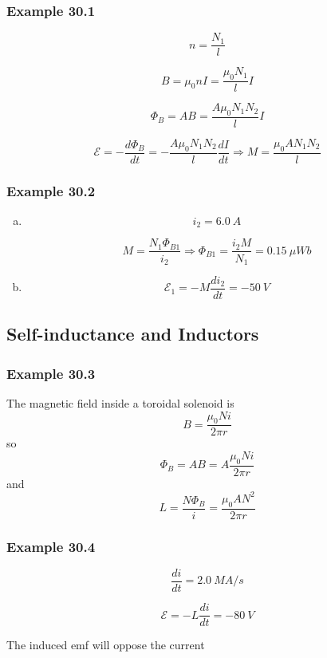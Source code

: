 \documentclass{article}
\begin{document}
\subsubsection{Example 30.1}

\[n = \frac{N_1}{l}\]

\[B = \mu_0 n I = \frac{\mu_0 N_1}{l} I\]

\[\Phi_B = A B = \frac{A \mu_0 N_1 N_2}{l} I\]

\[\mathcal{E} = -\frac{d \Phi_B}{dt} = -\frac{A \mu_0 N_1 N_2}{l} \frac{dI}{dt} \Rightarrow M = \frac{\mu_0 A N_1 N_2}{l}\]

\subsubsection{Example 30.2}

\begin{enumerate}[(a)]
  \item

        \[i_2 = \qty{6.0}{A}\]

        \[M = \frac{N_1 \Phi_{B1}}{i_2} \Rightarrow \Phi_{B1} = \frac{i_2 M}{N_1} = \qty{0.15}{\mu Wb}\]

  \item \[\mathcal{E}_1 = -M \frac{di_2}{dt} = -\qty{50}{V}\]

\end{enumerate}

\subsection{Self-inductance and Inductors}

\subsubsection{Example 30.3}

The magnetic field inside a toroidal solenoid is \[B = \frac{\mu_0 N i}{2 \pi r}\] so \[\Phi_B = A B = A \frac{\mu_0 N i}{2 \pi r}\] and \[L = \frac{N \Phi_B}{i} = \frac{\mu_0 A N^2}{2 \pi r}\]

\subsubsection{Example 30.4}

\[\frac{di}{dt} = \qty{2.0}{MA/s}\]

\[\mathcal{E} = -L \frac{di}{dt} = \qty{-80}{V}\]

The induced emf will oppose the current
\end{document}

